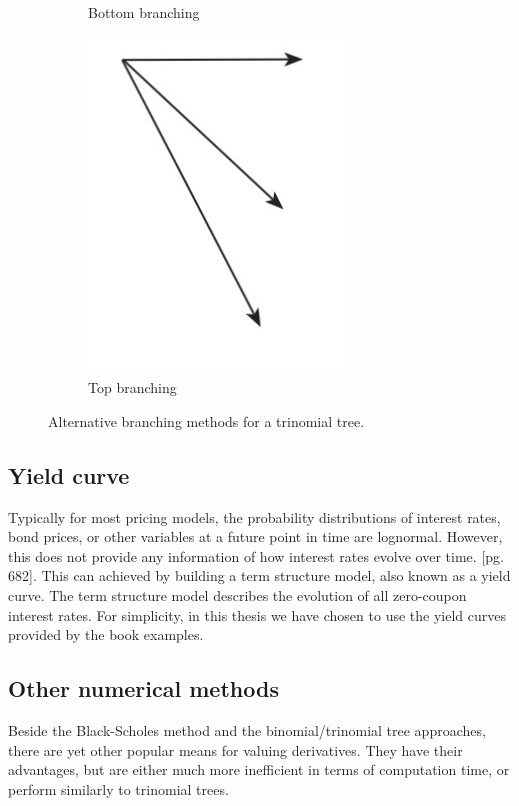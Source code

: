 \begin{figure}[H]
\begin{subfigure}{.3\textwidth}
  \caption{Bottom branching}
  \label{fig:background:altbranchingbottom}
\end{subfigure}
\begin{subfigure}{.3\textwidth}
  \centering
  \includegraphics[width=.7\linewidth]{img/topbranch.jpg}
  \caption{Top branching}
  \label{fig:background:altbranchingtop}
\end{subfigure}
\caption{Alternative branching methods for a trinomial tree.}
\end{figure}

\subsection{Yield curve}
Typically for most pricing models, the probability distributions of interest rates, bond prices, or other variables at a future point in time are lognormal. However, this does not provide any information of how interest rates evolve over time. \cite{ofod}[pg. 682]. This can achieved by building a term structure model, also known as a yield curve. The term structure model describes the evolution of all zero-coupon interest rates. For simplicity, in this thesis we have chosen to use the yield curves provided by the book examples.

\subsection{Other numerical methods}
Beside the Black-Scholes method and the binomial/trinomial tree approaches, there are yet other popular means for valuing derivatives. They have their advantages, but are either much more inefficient in terms of computation time, or perform similarly to trinomial trees. 

